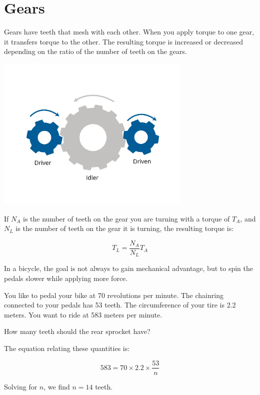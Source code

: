 \section{Gears}

Gears have teeth that mesh with each other. When you apply torque to one gear, it transfers torque to the other. The resulting torque is increased or decreased depending on the ratio of the number of teeth on the gears.

\includegraphics[width=0.7\textwidth]{gearsNew.png}

If \( N_A \) is the number of teeth on the gear you are turning with a torque of \( T_A \), and \( N_L \) is the number of teeth on the gear it is turning, the resulting torque is:

\[
T_L = \frac{N_A}{N_L} T_A
\]
\begin{Exercise}[title={Gears}, label=gear]
In a bicycle, the goal is not always to gain mechanical advantage, but to spin the pedals slower while applying more force.

You like to pedal your bike at 70 revolutions per minute. The chainring connected to your pedals has 53 teeth. The circumference of your tire is 2.2 meters. You want to ride at 583 meters per minute.

How many teeth should the rear sprocket have?
\end{Exercise}
\begin{Answer}[ref=gear]
The equation relating these quantities is:

\[
583 = 70 \times 2.2 \times \frac{53}{n}
\]

Solving for \( n \), we find \( n = 14 \) teeth.
\end{Answer}

